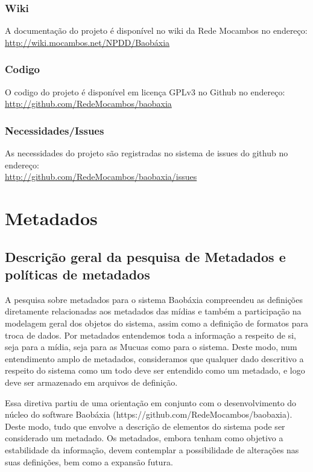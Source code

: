 \subsection{Wiki}
A documentação do projeto é disponível no wiki da Rede Mocambos no
endereço: \\
\url{http://wiki.mocambos.net/NPDD/Baobáxia}

\subsection{Codigo}
O codigo do projeto é disponível em licença GPLv3 no Github no
endereço: \\
\url{http://github.com/RedeMocambos/baobaxia}

\subsection{Necessidades/Issues}
As necessidades do projeto são registradas no sistema de issues do
github no endereço: \\
\url{http://github.com/RedeMocambos/baobaxia/issues}



\label{Metadados}

\chapter{Metadados}

\section{Descrição geral da pesquisa de Metadados e políticas de metadados}
A pesquisa sobre metadados para o sistema Baobáxia compreendeu as
definições diretamente relacionadas aos metadados das mídias e também
a participação na modelagem geral dos objetos do sistema, assim como a
definição de formatos para troca de dados. Por metadados entendemos
toda a informação a respeito de si, seja para a mídia, seja para as
Mucuas como para o sistema. Deste modo, num entendimento amplo de
metadados, consideramos que qualquer dado descritivo a respeito do
sistema como um todo deve ser entendido como um metadado, e logo deve
ser armazenado em arquivos de definição.

Essa diretiva partiu de uma orientação em conjunto com o
desenvolvimento do núcleo do software Baobáxia
(https://github.com/RedeMocambos/baobaxia). Deste modo, tudo que
envolve a descrição de elementos do sistema pode ser considerado um
metadado. Os metadados, embora tenham como objetivo a estabilidade da
informação, devem contemplar a possibilidade de alterações nas suas
definições, bem como a expansão futura.

